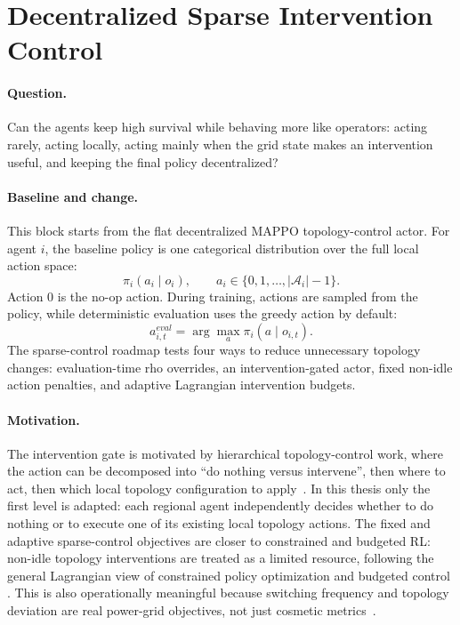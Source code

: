 \section{Decentralized Sparse Intervention Control}
\label{sec:sparse-intervention-control}

\paragraph{Question.}
Can the agents keep high survival while behaving more like operators: acting
rarely, acting locally, acting mainly when the grid state makes an intervention
useful, and keeping the final policy decentralized?

\paragraph{Baseline and change.}
This block starts from the flat decentralized MAPPO topology-control actor. For
agent \(i\), the baseline policy is one categorical distribution over the full
local action space:
\[
  \pi_i(a_i \mid o_i),
  \qquad
  a_i \in \{0,1,\ldots,|\mathcal A_i|-1\}.
\]
Action \(0\) is the no-op action. During training, actions are sampled from the
policy, while deterministic evaluation uses the greedy action by default:
\[
  a_{i,t}^{eval}=\arg\max_a \pi_i(a\mid o_{i,t}).
\]
The sparse-control roadmap tests four ways to reduce unnecessary topology
changes: evaluation-time rho overrides, an intervention-gated actor, fixed
non-idle action penalties, and adaptive Lagrangian intervention budgets.

\paragraph{Motivation.}
The intervention gate is motivated by hierarchical topology-control work, where
the action can be decomposed into ``do nothing versus intervene'', then where to
act, then which local topology configuration to apply~\cite{manczak2023hrl,
vandersar2023hmarl}. In this thesis only the first level is adapted: each
regional agent independently decides whether to do nothing or to execute one of
its existing local topology actions. The fixed and adaptive sparse-control
objectives are closer to constrained and budgeted RL: non-idle topology
interventions are treated as a limited resource, following the general
Lagrangian view of constrained policy optimization and budgeted control
\cite{achiam2017cpo,stooke2020pid,carrara2019budgeted}. This is also
operationally meaningful because switching frequency and topology deviation are
real power-grid objectives, not just cosmetic metrics~\cite{lautenbacher2025morl}.

